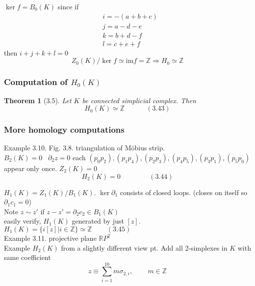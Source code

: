 \documentclass[twoside]{amsart}
\newtheorem{theorem}{Theorem}
\begin{document}
$\ker{f} = B_0(K)$ since if
\[
\begin{aligned}
  & i = - ( a + b+ c) \\ 
  & j = a-  d  -e \\ 
  & k = b + d - f \\ 
  & l = c + e+ f 
\end{aligned}
\]
then $i+j + k + l =0$ 
\[
Z_0(K)/ \ker{f} \simeq \text{im}{f} = \mathbb{Z} \Longrightarrow \boxed{ H_0 \simeq \mathbb{Z}}
\]

\subsubsection{Computation of $H_0(K)$}

\begin{theorem}[3.5] Let $K$ be \emph{connected} simplicial complex.  Then
\begin{equation}
  H_0(K) \simeq \mathbb{Z} \quad \quad \quad \, (3.43)
\end{equation}
\end{theorem}

\subsubsection{More homology computations}

Example 3.10.  Fig. 3.8. triangulation of M\"{o}bius strip. \\
$B_2(K) =0$ \, $\partial_2 z =0$ each $(p_0 p_2), (p_1 p_4), (p_2 p_3), (p_4p_5), (p_3 p_1), (p_5p_0)$ appear only once.  $Z_2(K)=0$ 
\begin{equation}
H_2(K)= 0 \quad \quad \quad \quad \, (3.44)
\end{equation}

$H_1(K) = Z_1(K)/B_1(K)$.  $\ker{\partial_1}$ consists of closed loops. (closes on itself so $\partial_1 c_1 =0$) \\

Note $z \sim z'$ if $z - z' = \partial_2 c_2 \in B_1(K)$ \\
easily verify, $H_1(K)$ generated by just $[z]$.  $H_1(K) = \lbrace i [z] | i \in \mathbb{Z} \rbrace \simeq \mathbb{Z} \quad \quad \, (3.45)$ \\

Example 3.11. projective plane $\mathbb{R}P^2$ \\
 
Example $H_2(K)$ from a slightly different view pt.  Add all 2-simplexes in $K$ with same coefficient
\[
z \equiv \sum_{i=1}^{10} m \sigma_{2,i}, \quad \quad \, m \in \mathbb{Z}
\]
\end{document}
